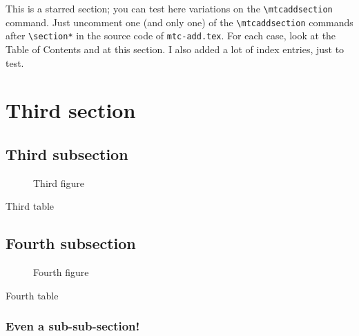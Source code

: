 \documentclass[oneside,12pt,a4paper]{article}
\begin{document}
This is a starred section; you can test here variations on
the \verb|\mtcaddsection| command. Just uncomment one (and
only one) of the \verb|\mtcaddsection| commands after
\verb|\section*| in the source code of \texttt{mtc-add.tex}.
For each case, look at the Table of Contents
and at this section.
%
%
%
%
%
%
%
%
%
%
I also added a lot of index entries, just to test.

\section{Third section}
\secttoc \mtcskip \sectlof \mtcskip \sectlot
\subsection{Third subsection}

\begin{figure}
\caption{Third figure}
\end{figure}
\begin{table}
\caption{Third table}
\end{table}

\subsection{Fourth subsection}

\begin{figure}
\caption{Fourth figure}
\end{figure}
\begin{table}
\caption{Fourth table}
\end{table}

\subsubsection{Even a sub-sub-section!}
\end{document}
